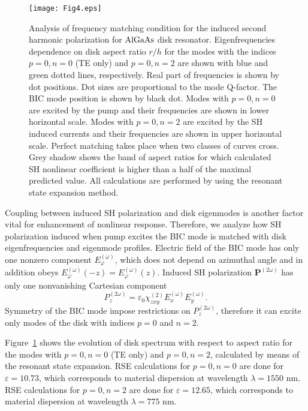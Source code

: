 \documentclass[prl,notitlepage,twocolumn]{revtex4}
\begin{document}
\begin{figure}[t]
   \centering
   \texttt{[image: Fig4.eps]} 
   \caption{ Analysis of frequency matching condition for the induced second harmonic polarization for ${\rm AlGaAs}$ disk resonator. Eigenfrequencies dependence on disk aspect ratio $r/h$ for the modes with the indices $p=0, n = 0$ (TE only) and $p=0, n = 2$ are shown with blue and green dotted lines, respectively. Real part of frequencies is shown by dot positions. Dot sizes are proportional to the mode Q-factor. The BIC mode position is shown by black dot. Modes with $p=0, n=0$ are excited by the pump and their frequencies are shown in lower horizontal scale. Modes with $p=0, n=2$ are excited by the SH induced currents and their frequencies are shown in upper horizontal scale. Perfect matching takes place when two classes of curves cross. Grey shadow shows the band of aspect ratios for which calculated SH nonlinear coefficient is higher than a half of the maximal predicted value. All calculations are performed by using the resonant state expansion method.}
 \label{fig:figure_4}
\end{figure}

Coupling between induced SH polarization and disk eigenmodes is another factor vital for enhancement of nonlinear response. Therefore, we analyze how SH polarization induced when pump excites the BIC mode is matched with disk eigenfrequencies and eigenmode profiles. Electric field of the BIC mode has only one nonzero component $E_{\varphi}^{(\omega)}$, which does not depend on azimuthal angle and in addition obeys $E_{\varphi}^{(\omega)}(-z) = E_{\varphi}^{(\omega)}(z)$. Induced SH polarization $\mathbf{P}^{(2\omega)}$  has only one nonvanishing Cartesian component
\begin{equation}
P_z^{(2\omega)}=\varepsilon_0 \chi_{zxy}^{(2)}E_x^{(\omega)}E_y^{(\omega)}.
\end{equation}
Symmetry of the BIC mode impose restrictions on $P_z^{(2\omega)}$, therefore it can excite only modes of the disk with indices $p=0$ and $n=2$. 

Figure~\ref{fig:figure_4} shows the evolution of disk spectrum with respect to aspect ratio for the modes with $p=0, n=0$ (TE only) and $p=0, n=2$, calculated by means of the resonant state expansion. RSE calculations for $p=0, n=0$ are done for $\varepsilon = 10.73$, which corresponds to material dispersion at wavelength $\lambda =1550$ nm.  RSE calculations for $p=0, n=2$ are done for  $\varepsilon = 12.65$, which corresponds to material dispersion at wavelength $\lambda =775$ nm.
\end{document}
